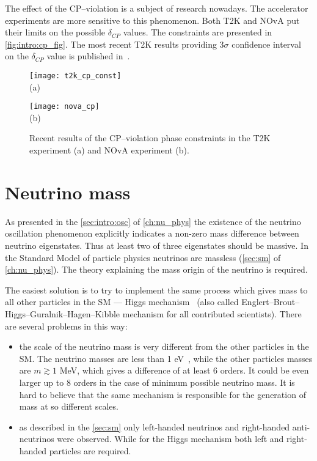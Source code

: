 \documentclass[../main.tex]{subfiles}
\begin{document}
The effect of the CP--violation is a subject of research nowadays. The accelerator experiments are more sensitive to this phenomenon. Both T2K and NOvA put their limits on the possible $\delta_{CP}$ values. The constraints are presented in \autoref{fig:intro:cp_fig}. The most recent T2K results providing 3$\sigma$ confidence interval on the $\delta_{CP}$ value is published in~\cite{Abe2020n}.

\begin{figure}
  \centering
  \begin{minipage}{0.49\linewidth}
    \centering
    \texttt{[image: t2k\_cp\_const]} \\ (a)
  \end{minipage}
  \begin{minipage}{0.49\linewidth}
    \centering
    \texttt{[image: nova\_cp]} \\ (b)
  \end{minipage}
  \caption{Recent results of the CP--violation phase constraints in the T2K experiment (a)\cite{Abe2019c} and NOvA experiment (b)\cite{Acero2019}.}
  \label{fig:intro:cp_fig}

\end{figure}


\chapter{Neutrino mass}
\label{ch:intro:HNL}

As presented in the \autoref{sec:intro:osc} of \autoref{ch:nu_phys} the existence of the neutrino oscillation phenomenon explicitly indicates a non-zero mass difference between neutrino eigenstates. Thus at least two of three eigenstates should be massive. In the Standard Model of particle physics neutrinos are massless (\autoref{sec:sm} of  \autoref{ch:nu_phys}). The theory explaining the mass origin of the neutrino is required.

The easiest solution is to try to implement the same process which gives mass to all other particles in the SM --- Higgs mechanism~\cite{Higgs1964} (also called Englert–Brout–Higgs–Guralnik–Hagen–Kibble mechanism for all contributed scientists). There are several problems in this way:
\begin{itemize}
  \item the scale of the neutrino mass is very different from the other particles in the SM. The neutrino masses are less than 1 eV~\cite{Aker2019}, while the other particles masses are $m\gtrsim 1$ MeV, which gives a difference of at least 6 orders. It could be even larger up to 8 orders in the case of minimum possible neutrino mass. It is hard to believe that the same mechanism is responsible for the generation of mass at so different scales.
  \item as described in the \autoref{sec:sm} only left-handed neutrinos and right-handed anti-neutrinos were observed. While for the Higgs mechanism both left and right-handed particles are required.
\end{itemize}
\end{document}
